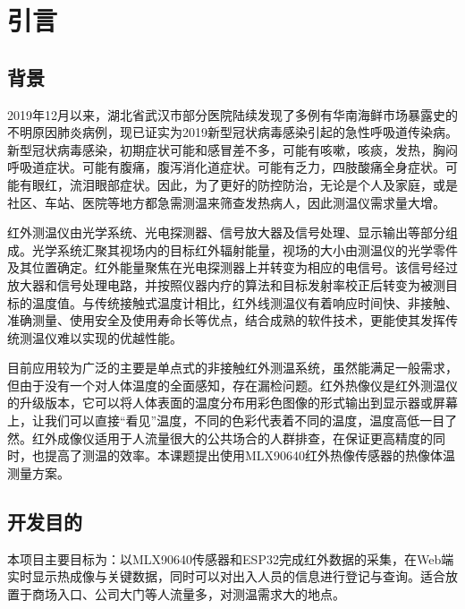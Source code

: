 \chapter{引言}
\section{背景}
2019年12月以来，湖北省武汉市部分医院陆续发现了多例有华南海鲜市场暴露史的不明原因肺炎病例，现已证实为2019新型冠状病毒感染引起的急性呼吸道传染病。新型冠状病毒感染，初期症状可能和感冒差不多，可能有咳嗽，咳痰，发热，胸闷呼吸道症状。可能有腹痛，腹泻消化道症状。可能有乏力，四肢酸痛全身症状。可能有眼红，流泪眼部症状。因此，为了更好的防控防治，无论是个人及家庭，或是社区、车站、医院等地方都急需测温来筛查发热病人，因此测温仪需求量大增。

红外测温仪由光学系统、光电探测器、信号放大器及信号处理、显示输出等部分组成。光学系统汇聚其视场内的目标红外辐射能量，视场的大小由测温仪的光学零件及其位置确定。红外能量聚焦在光电探测器上并转变为相应的电信号。该信号经过放大器和信号处理电路，并按照仪器内疗的算法和目标发射率校正后转变为被测目标的温度值。与传统接触式温度计相比，红外线测温仪有着响应时间快、非接触、准确测量、使用安全及使用寿命长等优点，结合成熟的软件技术，更能使其发挥传统测温仪难以实现的优越性能。

目前应用较为广泛的主要是单点式的非接触红外测温系统，虽然能满足一般需求，但由于没有一个对人体温度的全面感知，存在漏检问题。红外热像仪是红外测温仪的升级版本，它可以将人体表面的温度分布用彩色图像的形式输出到显示器或屏幕上，让我们可以直接“看见”温度，不同的色彩代表着不同的温度，温度高低一目了然。红外成像仪适用于人流量很大的公共场合的人群排查，在保证更高精度的同时，也提高了测温的效率。本课题提出使用MLX90640红外热像传感器的热像体温测量方案。
\section{开发目的}
本项目主要目标为：以MLX90640传感器和ESP32完成红外数据的采集，在Web端实时显示热成像与关键数据，同时可以对出入人员的信息进行登记与查询。适合放置于商场入口、公司大门等人流量多，对测温需求大的地点。
